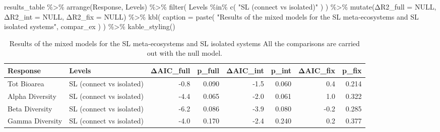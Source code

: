 \documentclass[
]{article}
\newenvironment{Shaded}{\begin{snugshade}}{\end{snugshade}}
\newcommand{\AttributeTok}[1]{\textcolor[rgb]{0.77,0.63,0.00}{#1}}
\newcommand{\ConstantTok}[1]{\textcolor[rgb]{0.00,0.00,0.00}{#1}}
\newcommand{\FunctionTok}[1]{\textcolor[rgb]{0.00,0.00,0.00}{#1}}
\newcommand{\NormalTok}[1]{#1}
\newcommand{\SpecialCharTok}[1]{\textcolor[rgb]{0.00,0.00,0.00}{#1}}
\newcommand{\StringTok}[1]{\textcolor[rgb]{0.31,0.60,0.02}{#1}}
\begin{document}
\begin{Shaded}
\begin{Highlighting}[]
\NormalTok{results\_table }\SpecialCharTok{\%\textgreater{}\%}
  \FunctionTok{arrange}\NormalTok{(Response, Levels) }\SpecialCharTok{\%\textgreater{}\%}
  \FunctionTok{filter}\NormalTok{(}
\NormalTok{    Levels }\SpecialCharTok{\%in\%} \FunctionTok{c}\NormalTok{(}
      \StringTok{"SL (connect vs isolated)"}
\NormalTok{    )}
\NormalTok{  ) }\SpecialCharTok{\%\textgreater{}\%}
  \FunctionTok{mutate}\NormalTok{(Δ}\AttributeTok{R2\_full =} \ConstantTok{NULL}\NormalTok{,}
\NormalTok{         Δ}\AttributeTok{R2\_int =} \ConstantTok{NULL}\NormalTok{,}
\NormalTok{         Δ}\AttributeTok{R2\_fix =} \ConstantTok{NULL}\NormalTok{) }\SpecialCharTok{\%\textgreater{}\%}
  \FunctionTok{kbl}\NormalTok{(}
    \AttributeTok{caption =} \FunctionTok{paste}\NormalTok{(}
      \StringTok{"Results of the mixed models for the SL meta{-}ecosystems and SL isolated systems"}\NormalTok{,}
\NormalTok{      compar\_ex}
\NormalTok{    )}
\NormalTok{  ) }\SpecialCharTok{\%\textgreater{}\%}
  \FunctionTok{kable\_styling}\NormalTok{()}
\end{Highlighting}
\end{Shaded}

\begin{table}

\caption{\label{tab:fig-connected-systems}Results of the mixed models for the SL meta-ecosystems and SL isolated systems All the comparisons are carried out with the null model.}
\centering
\begin{tabular}[t]{l|l|r|r|r|r|r|r}
\hline
Response & Levels & ΔAIC\_full & p\_full & ΔAIC\_int & p\_int & ΔAIC\_fix & p\_fix\\
\hline
Tot Bioarea & SL (connect vs isolated) & -0.8 & 0.090 & -1.5 & 0.060 & 0.4 & 0.214\\
\hline
Alpha Diversity & SL (connect vs isolated) & -4.4 & 0.065 & -2.0 & 0.061 & 1.0 & 0.322\\
\hline
Beta Diversity & SL (connect vs isolated) & -6.2 & 0.086 & -3.9 & 0.080 & -0.2 & 0.285\\
\hline
Gamma Diversity & SL (connect vs isolated) & -4.0 & 0.170 & -2.4 & 0.240 & 0.2 & 0.377\\
\hline
\end{tabular}
\end{table}
\end{document}

